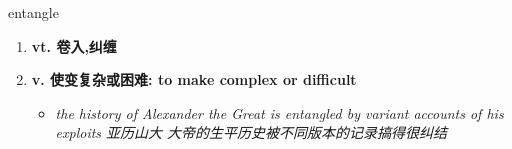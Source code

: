 
\begin{frame}
{\huge entangle}
\begin{center}
\begin{enumerate}\Large
  \item \textbf{vt. 卷入,纠缠}
  \item \textbf{v. 使变复杂或困难: to make complex or difficult}
  \begin{itemize}
    \item \em{\Large{the history of Alexander the Great is entangled by variant accounts of his exploits 亚历山大 大帝的生平历史被不同版本的记录搞得很纠结}}
  \end{itemize}
\end{enumerate}
\end{center}
\end{frame}
